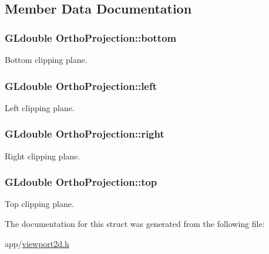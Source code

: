 \subsection{Member Data Documentation}
\hypertarget{struct_ortho_projection_ae2a5eb9c806d61f26cbce67639880915}{
\subsubsection[{bottom}]{\setlength{\rightskip}{0pt plus 5cm}G\-Ldouble Ortho\-Projection\-::bottom}}\label{struct_ortho_projection_ae2a5eb9c806d61f26cbce67639880915}
Bottom clipping plane. \hypertarget{struct_ortho_projection_a4cacc486e79687686061e32cf8eaeb2a}{
\subsubsection[{left}]{\setlength{\rightskip}{0pt plus 5cm}G\-Ldouble Ortho\-Projection\-::left}}\label{struct_ortho_projection_a4cacc486e79687686061e32cf8eaeb2a}
Left clipping plane. \hypertarget{struct_ortho_projection_a140ce0f7bca9b77c1c511e711836c4cc}{
\subsubsection[{right}]{\setlength{\rightskip}{0pt plus 5cm}G\-Ldouble Ortho\-Projection\-::right}}\label{struct_ortho_projection_a140ce0f7bca9b77c1c511e711836c4cc}
Right clipping plane. \hypertarget{struct_ortho_projection_a6cb9f21197e582876b5d1dba5d83333a}{
\subsubsection[{top}]{\setlength{\rightskip}{0pt plus 5cm}G\-Ldouble Ortho\-Projection\-::top}}\label{struct_ortho_projection_a6cb9f21197e582876b5d1dba5d83333a}
Top clipping plane. 

The documentation for this struct was generated from the following file\-:\begin{DoxyCompactItemize}
\item 
app/\hyperlink{viewport2d_8h}{viewport2d.\-h}\end{DoxyCompactItemize}
